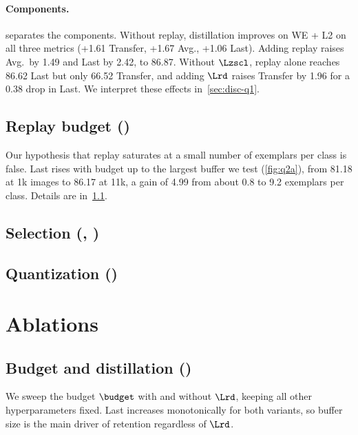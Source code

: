 \paragraph{Components.}
 separates the components. Without replay, distillation improves
on WE + L2 on all three metrics (+1.61 Transfer, +1.67 Avg., +1.06 Last). Adding
replay raises Avg.\ by 1.49 and Last by 2.42, to 86.87. Without $\Lzscl$, replay
alone reaches 86.62 Last but only 66.52 Transfer, and adding $\Lrd$ raises
Transfer by 1.96 for a 0.38 drop in Last. We interpret these effects
in~\cref{sec:disc-q1}.

\subsection{Replay budget ()}
\label{sec:res-q2a}
Our hypothesis that replay saturates at a small number of exemplars per class is
false. Last rises with budget up to the largest buffer we test
(\cref{fig:q2a}), from 81.18 at 1k images to 86.17 at 11k, a gain of
4.99 from about 0.8 to 9.2 exemplars per class.  Details are
in~\cref{sec:abl-budget}.

\subsection{Selection (, )}
\label{sec:res-select}

\subsection{Quantization ()}
\label{sec:res-quant}

\section{Ablations}
\label{sec:ablations}

\subsection{Budget and distillation ()}
\label{sec:abl-budget}
We sweep the budget $\budget$ with and without $\Lrd$, keeping all other
hyperparameters fixed. Last increases monotonically for both
variants, so buffer size is the main driver of retention regardless of $\Lrd$.

